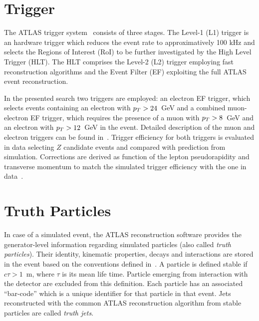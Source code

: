 \section{Trigger}
The ATLAS trigger system~\cite{trigger} consists of three stages. The Level-1 (L1) trigger is an
hardware trigger which reduces the event rate to approximatively 100 kHz and selects the Regions of
Interest (RoI) to be further investigated by the High Level Trigger (HLT). The HLT
comprises the Level-2 (L2) trigger employing fast reconstruction algorithms and the
Event Filter (EF) exploiting the full ATLAS event reconstruction.

In the presented search two triggers are employed: an electron EF trigger, which selects events containing 
an electron with $p_{T} >24 $~GeV and a combined muon-electron EF trigger, which requires the presence of a muon with $p_{T} > 8$~GeV and 
an electron with $p_{T} > 12$~GeV in the event. Detailed description of the muon and electron triggers can be found in~\cite{triggermu,triggere}.
Trigger efficiency for both triggers is evaluated in data selecting $Z$ candidate events and compared with prediction from simulation. Corrections are derived 
as function of the lepton pseudorapidity and transverse  momentum to match the simulated  trigger efficiency 
with the one in  data~\cite{triggermu,triggere}.

\section{Truth Particles}
In case of a simulated event, the ATLAS reconstruction software provides the generator-level information regarding
simulated particles (also called \emph{truth particles}). Their identity, kinematic properties, decays and 
interactions are stored in the event  based on the conventions defined in~\cite{hepmc}.
A particle is defined stable if $c \tau > 1$~m, where $\tau$ is its mean life time. Particle emerging from 
interaction with the detector are excluded from this definition. 
Each particle has an associated ``bar-code'' which is a unique identifier for that particle
in that event. Jets reconstructed with the common ATLAS reconstruction algorithm from stable particles are called \emph{truth jets}.























